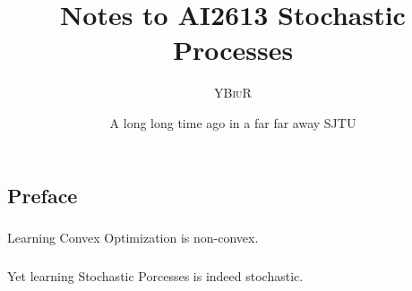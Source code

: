 \documentclass[oneside]{book}
\title{Notes to AI2613 Stochastic Processes}
\author{\textsc{YBiuR}}
\date{A long long time ago in a far far away SJTU}
\theoremstyle{definition}
\theoremstyle{remark}
\begin{document}
\begin{spacing}{1.5}
\setlength{\parindent}{0em}

\frontmatter
\maketitle
\chapter*{Preface}
\paragraph{}Learning Convex Optimization is non-convex.
\paragraph{}Yet learning Stochastic Porcesses is indeed stochastic.
\mainmatter

\end{spacing}
\end{document}
